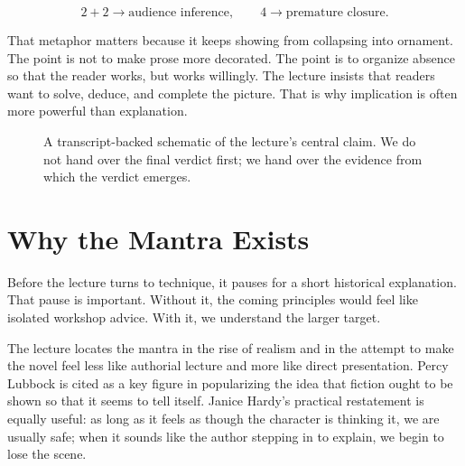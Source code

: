 \begin{equation}
2+2 \to \text{audience inference}, \qquad 4 \to \text{premature closure}.
\end{equation}

That metaphor matters because it keeps showing from collapsing into ornament. The point is not to make prose more decorated. The point is to organize absence so that the reader works, but works willingly. The lecture insists that readers want to solve, deduce, and complete the picture. That is why implication is often more powerful than explanation.

\begin{figure}[h]
\centering
{}
\caption{A transcript-backed schematic of the lecture's central claim. We do not hand over the final verdict first; we hand over the evidence from which the verdict emerges.}
\end{figure}

\section{Why the Mantra Exists}

Before the lecture turns to technique, it pauses for a short historical explanation. That pause is important. Without it, the coming principles would feel like isolated workshop advice. With it, we understand the larger target.

The lecture locates the mantra in the rise of realism and in the attempt to make the novel feel less like authorial lecture and more like direct presentation. Percy Lubbock is cited as a key figure in popularizing the idea that fiction ought to be shown so that it seems to tell itself. Janice Hardy's practical restatement is equally useful: as long as it feels as though the character is thinking it, we are usually safe; when it sounds like the author stepping in to explain, we begin to lose the scene.

